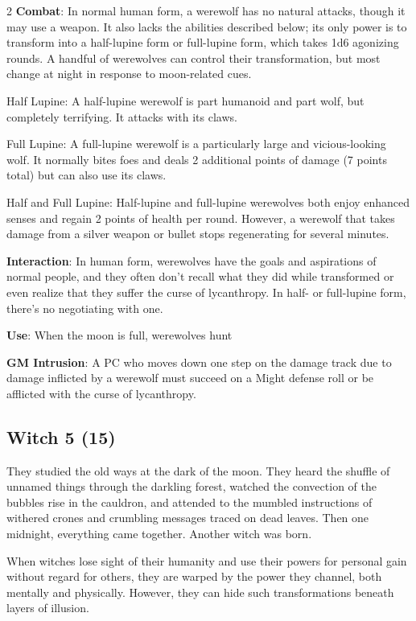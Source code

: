 \begin{multicols}{2}
\textbf{Combat}: In normal human form, a werewolf has no natural attacks, though it may use a weapon. It also lacks the abilities described below; its only power is to transform into a half-lupine form or full-lupine form, which takes 1d6 agonizing rounds. A handful of werewolves can control their transformation, but most change at night in response to moon-related cues.

Half Lupine: A half-lupine werewolf is part humanoid and part wolf, but completely terrifying. It attacks with its claws.

Full Lupine: A full-lupine werewolf is a particularly large and vicious-looking wolf. It normally bites foes and deals 2 additional points of damage (7 points total) but can also use its claws.

Half and Full Lupine: Half-lupine and full-lupine werewolves both enjoy enhanced senses and regain 2 points of health per round. However, a werewolf that takes damage from a silver weapon or bullet stops regenerating for several minutes.

\textbf{Interaction}: In human form, werewolves have the goals and aspirations of normal people, and they often don’t recall what they did while transformed or even realize that they suffer the curse of lycanthropy. In half- or full-lupine form, there’s no negotiating with one.

\textbf{Use}: When the moon is full, werewolves hunt

\textbf{GM Intrusion}: A PC who moves down one step on the damage track due to damage inflicted by a werewolf must succeed on a Might defense roll or be afflicted with the curse of lycanthropy.

\subsection{Witch	5 (15)}

They studied the old ways at the dark of the moon. They heard the shuffle of unnamed things through the darkling forest, watched the convection of the bubbles rise in the cauldron, and attended to the mumbled instructions of withered crones and crumbling messages traced on dead leaves. Then one midnight, everything came together. Another witch was born.

When witches lose sight of their humanity and use their powers for personal gain without regard for others, they are warped by the power they channel, both mentally and physically. However, they can hide such transformations beneath layers of illusion.


\end{multicols}
